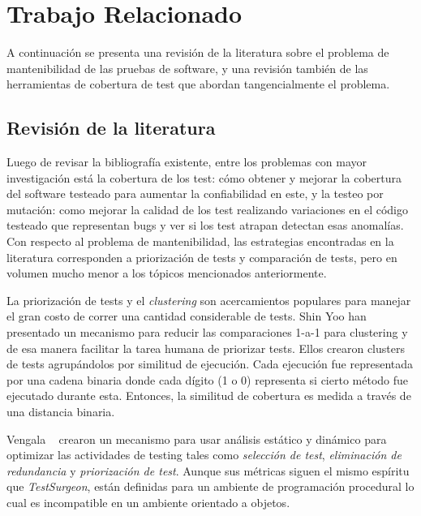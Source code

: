 \section{Trabajo Relacionado}

\par A continuación se presenta una revisión de la literatura sobre el problema de mantenibilidad de las pruebas de software, y una revisión también de las herramientas de cobertura de test que abordan tangencialmente el problema.

\subsection{Revisión de la literatura}
\par Luego de revisar la bibliografía existente, entre los problemas con mayor investigación está la cobertura de los test: cómo obtener y mejorar la cobertura del software testeado para aumentar la confiabilidad en este, y la testeo por mutación: como mejorar la calidad de los test realizando variaciones en el código testeado que representan bugs y ver si los test atrapan detectan esas anomalías. Con respecto al problema de mantenibilidad, las estrategias encontradas en la literatura corresponden a priorización de tests y comparación de tests, pero en volumen mucho menor a los tópicos mencionados anteriormente.

\par La priorización de tests y el \emph{clustering} son acercamientos populares para manejar el gran costo de correr una cantidad considerable de tests. Shin Yoo \etal han presentado un mecanismo para reducir las comparaciones 1-a-1 para clustering y de esa manera facilitar la tarea humana de priorizar tests. Ellos crearon clusters de tests agrupándolos por similitud de ejecución. Cada ejecución fue representada por una cadena binaria donde cada dígito (1 o 0) representa si cierto método fue ejecutado durante esta. Entonces, la similitud de cobertura es medida a través de una distancia binaria.

\par Vengala \etal~\cite{Vang09a} crearon un mecanismo para usar análisis estático y dinámico para optimizar las actividades de testing tales como \emph{selección de test}, \emph{eliminación de redundancia} y \emph{priorización de test}. Aunque sus métricas siguen el mismo espíritu que \emph{TestSurgeon}, están definidas para un ambiente de programación procedural lo cual es incompatible en un ambiente orientado a objetos.


